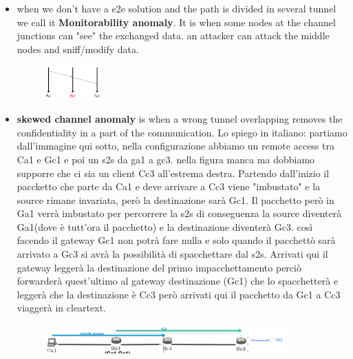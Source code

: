 \documentclass{article}
\begin{document}
\begin{itemize}
    \begin{itemize}
        \item when we don't have a e2e solution and the path is divided in several tunnel we call it \textbf{Monitorability anomaly}. It is when some nodes at the channel junctions can "see" the exchanged data. an attacker can attack the middle nodes and sniff/modify data.
        \begin{figure}[h]
        \centering
            \includegraphics[width=0.20\textwidth]{figure/monitorability_anomaly.png}
        \end{figure}
        \item \textbf{skewed channel anomaly} is when a wrong tunnel overlapping removes the confidentiality in a part of the communication. Lo spiego in italiano: partiamo dall'immagine qui sotto, nella configurazione abbiamo un remote access tra Ca1 e Gc1 e poi un s2s da ga1 a gc3. nella figura manca ma dobbiamo supporre che ci sia un client Cc3 all'estrema destra. Partendo dall'inizio il paccketto che parte da Ca1 e deve arrivare a Cc3 viene "imbustato" e la source rimane invariata, però la destinazione sarà Gc1. Il pacchetto però in Ga1 verrà imbustato per percorrere la s2s di conseguenza la source diventerà Ga1(dove è tutt'ora il pacchetto) e la destinazione diventerà Gc3. così facendo il gateway Gc1 non potrà fare nulla e solo quando il pacchettò sarà arrivato a Gc3 si avrà la possibilità di spacchettare dal s2s. Arrivati qui il gateway leggerà la destinazione del primo impacchettamento perciò forwarderà quest'ultimo al gateway destinazione (Gc1) che lo spacchetterà e leggerà che la destinazione è Cc3 però arrivati qui il pacchetto da Gc1 a Cc3 viaggerà in cleartext. 
        \begin{figure}[h]
        \centering
            \includegraphics[width=0.90\textwidth]{figure/skewed_channel.png}
        \end{figure}
        
    \end{itemize}
\end{itemize}
\end{document}
